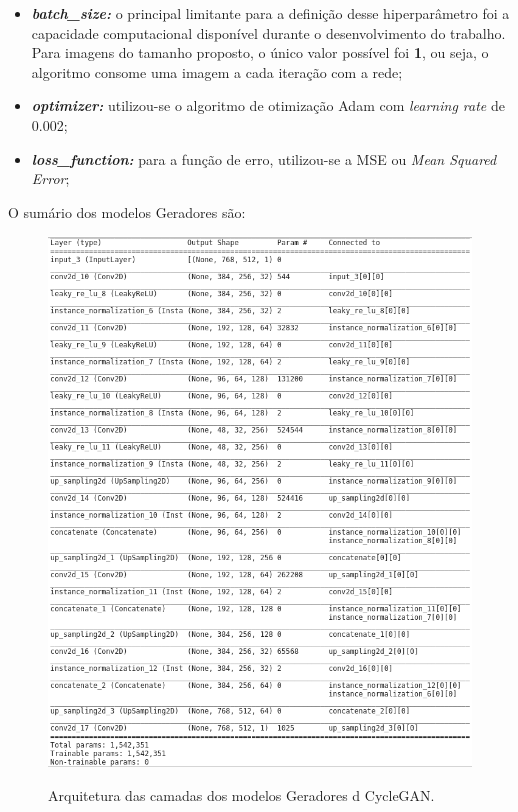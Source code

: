 \begin{itemize}
  \item \textit{\textbf{batch\_size:}} o principal limitante para a definição desse hiperparâmetro foi a capacidade computacional disponível durante o desenvolvimento do trabalho. Para imagens do tamanho proposto, o único valor possível foi \textbf{1}, ou seja, o algoritmo consome uma imagem a cada iteração com a rede;
  \item \textbf{\textit{optimizer:}} utilizou-se o algoritmo de otimização Adam com \textit{learning rate} de 0.002;
  \item \textit{\textbf{loss\_function:}} para a função de erro, utilizou-se a MSE ou \textit{Mean Squared Error};
\end{itemize}

O sumário dos modelos Geradores são:

\begin{figure}[H]
  \centering
  \caption{Arquitetura das camadas dos modelos Geradores d CycleGAN.}
  \includegraphics[scale=.55]{figuras/generator-architecture.png}
  \label{fig:generator-architecture}
\end{figure}

